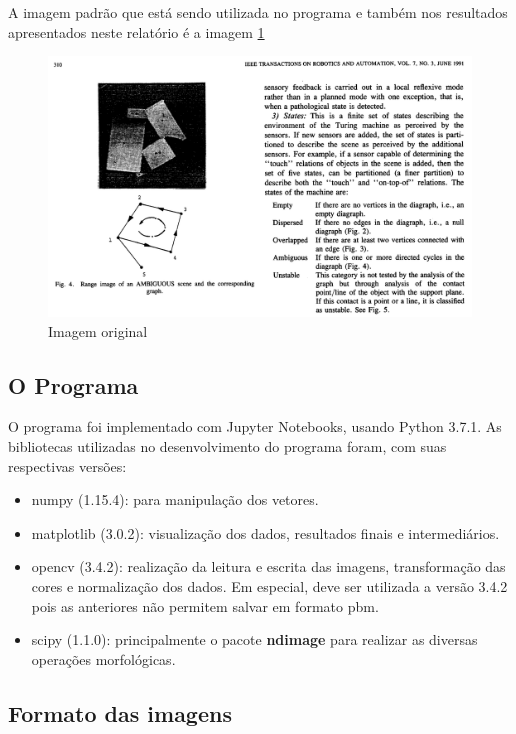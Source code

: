 \documentclass{article}
\begin{document}
A imagem padrão que está sendo utilizada no programa e também nos resultados apresentados neste relatório é a imagem \ref{Fig:original}

\begin{figure}[!htb]
  \centering
  \includegraphics[width=.8\linewidth]{original.png}
  \caption{Imagem original}\label{Fig:original}
\end{figure}


\subsection{O Programa}

O programa foi implementado com Jupyter Notebooks, usando Python 3.7.1. As bibliotecas utilizadas no desenvolvimento do programa foram, com suas respectivas versões: 

\begin{itemize}
    \item numpy (1.15.4): para manipulação dos vetores.

    \item matplotlib (3.0.2): visualização dos dados, resultados finais e intermediários.

    \item opencv (3.4.2): realização da leitura e escrita das imagens, transformação das cores e normalização dos dados. Em especial, deve ser utilizada a versão 3.4.2 pois as anteriores não permitem salvar em formato pbm.
    
    \item scipy (1.1.0): principalmente o pacote \textbf{ndimage} para realizar as diversas operações morfológicas.
\end{itemize}

\subsection{Formato das imagens}
\end{document}
